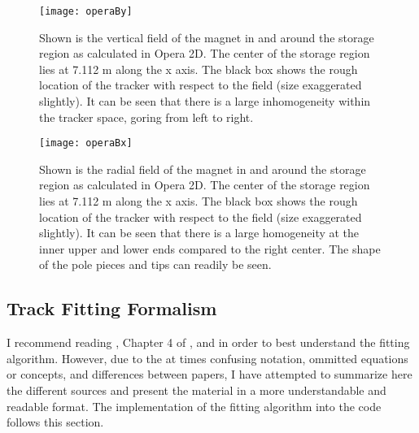\begin{figure}[]
    \label{fig:operaBy}
	\centering
	\texttt{[image: operaBy]}
    \caption[Vertical magnetic field from Opera2D]{Shown is the vertical field of the \gmtwo magnet in and around the storage region as calculated in Opera 2D. The center of the storage region lies at 7.112 m along the x axis. The black box shows the rough location of the tracker with respect to the field (size exaggerated slightly). It can be seen that there is a large inhomogeneity within the tracker space, goring from left to right.}
\end{figure}

\begin{figure}[]
    \label{fig:operaBx}
	\centering
	\texttt{[image: operaBx]}
    \caption[Horizontal magnetic field from Opera2D]{Shown is the radial field of the \gmtwo magnet in and around the storage region as calculated in Opera 2D. The center of the storage region lies at 7.112 m along the x axis. The black box shows the rough location of the tracker with respect to the field (size exaggerated slightly). It can be seen that there is a large homogeneity at the inner upper and lower ends compared to the right center. The shape of the pole pieces and tips can readily be seen.}
\end{figure}



\subsection{Track Fitting Formalism}
\label{sec:TrackFittingFormalism}

    I recommend reading \cite{geanemanual}, Chapter 4 of \cite{Lavezzi}, and \cite{trajfit} in order to best understand the fitting algorithm. However, due to the at times confusing notation, ommitted equations or concepts, and differences between papers, I have attempted to summarize here the different sources and present the material in a more understandable and readable format. The implementation of the fitting algorithm into the code follows this section.


